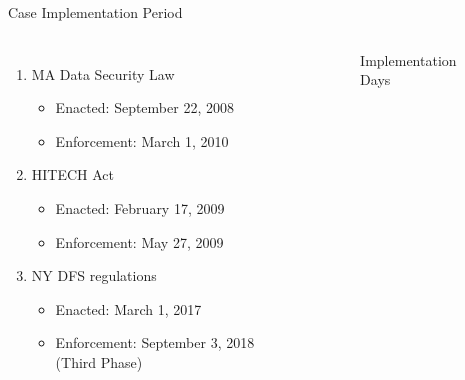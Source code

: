 \documentclass[10pt]{beamer}
\begin{document}
\begin{frame}{Case Implementation Period}
\begin{columns}
    \begin{enumerate}
      \item MA Data Security Law
          \begin{itemize}
              \item Enacted: September 22, 2008
              \item Enforcement: March 1, 2010
          \end{itemize}
      \item HITECH Act
            \begin{itemize}
                \item Enacted: February 17, 2009
                \item Enforcement: May 27, 2009
            \end{itemize}
      \item NY DFS regulations
          \begin{itemize}
              \item Enacted: March 1, 2017
              \item Enforcement: September 3, 2018 (Third Phase)
          \end{itemize}
    \end{enumerate}

    \begin{figure}
      \caption{Implementation Days} \label{fig:figure13}
\end{figure}
\end{columns}
\end{frame}
\end{document}
